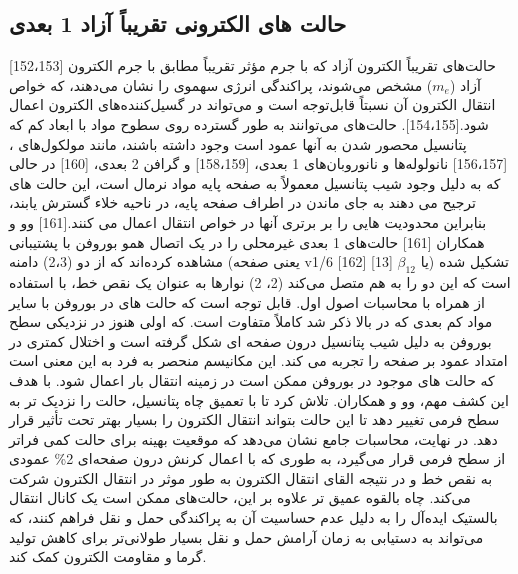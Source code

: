 \subsection{حالت های الکترونی تقریباً آزاد 1 بعدی}
[152،153] حالت‌های تقریباً الکترون آزاد  که با جرم مؤثر تقریباً مطابق با جرم الکترون آزاد ($m_e$) مشخص می‌شوند، پراکندگی انرژی سهموی را نشان می‌دهند، که خواص انتقال الکترون آن نسبتاً قابل‌توجه است و می‌تواند در گسیل‌کننده‌های الکترون اعمال شود.[154،155]. حالت‌های  می‌توانند به طور گسترده روی سطوح مواد با ابعاد کم که پتانسیل محصور شدن به آنها عمود است وجود داشته باشند، مانند مولکول‌های ، [156،157] نانولوله‌ها و نانوروبان‌های 1 بعدی، [158،159] و گرافن 2 بعدی، [160] در حالی که به دلیل وجود شیب پتانسیل معمولاً به صفحه پایه مواد نرمال است، این حالت های  ترجیح می دهند به جای ماندن در اطراف صفحه پایه، در ناحیه خلاء گسترش یابند، بنابراین محدودیت هایی را بر برتری آنها در خواص انتقال اعمال می کنند.[161] وو و همکاران [161] حالت‌های  1 بعدی غیرمحلی را در یک اتصال همو بوروفن با پشتیبانی  مشاهده کرده‌اند که از دو (2،3) دامنه (یعنی صفحه v1/6 [162] یا $\beta_{12}$ [13]) تشکیل شده است که این دو را به هم متصل می‌کند (2، 2) نوارها به عنوان یک نقص خط، با استفاده از  همراه با محاسبات اصول اول. قابل توجه است که حالت های  در بوروفن با سایر مواد کم بعدی که در بالا ذکر شد کاملاً متفاوت است. که اولی هنوز در نزدیکی سطح بوروفن به دلیل شیب پتانسیل درون صفحه ای شکل گرفته است و اختلال کمتری در امتداد عمود بر صفحه را تجربه می کند. این مکانیسم منحصر به فرد به این معنی است که حالت های  موجود در بوروفن ممکن است در زمینه انتقال بار اعمال شود. با هدف این کشف مهم، وو و همکاران. تلاش کرد تا با تعمیق چاه پتانسیل، حالت  را نزدیک تر به سطح فرمی تغییر دهد تا این حالت بتواند انتقال الکترون را بسیار بهتر تحت تأثیر قرار دهد. در نهایت، محاسبات جامع نشان می‌دهد که موقعیت بهینه برای حالت  کمی فراتر از سطح فرمی قرار می‌گیرد، به طوری که با اعمال کرنش درون صفحه‌ای 2\% عمودی به نقص خط و در نتیجه القای انتقال الکترون به طور موثر در انتقال الکترون شرکت می‌کند. چاه بالقوه عمیق تر علاوه بر این، حالت‌های  ممکن است یک کانال انتقال بالستیک ایده‌آل را به دلیل عدم حساسیت آن به پراکندگی حمل و نقل فراهم کنند، که می‌تواند به دستیابی به زمان آرامش حمل و نقل بسیار طولانی‌تر برای کاهش تولید گرما و مقاومت الکترون کمک کند.
